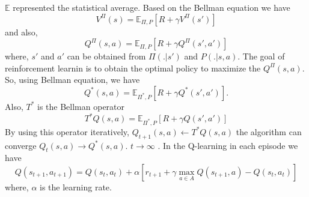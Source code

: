 \documentclass{article}
\begin{document}
  $\mathbb{E}$ represented the statistical average. 
 Based on the Bellman equation we have
 \begin{equation}
	V^{\Pi}(s) = \mathbb{E}_{\Pi,P}[R+\gamma V^{\Pi}(s')]
\end{equation}  
 and also, 
   \begin{equation}
  	Q^{\Pi}(s,a) = \mathbb{E}_{\Pi,P}[R+\gamma Q^{\Pi}(s',a')]
  \end{equation}  
  where, $s'$ and $a'$ can be obtained from $\Pi(.|s')$ and $P(.|s,a)$.
The goal of reinforcement learnin is to obtain the optimal policy to maximize the $Q^{\Pi}(s,a)$.
So, using Bellman equation, we have
\begin{equation}
	Q^{*}(s,a) = \mathbb{E}_{\Pi^*,P}[R+\gamma Q^{*}(s',a')].
\end{equation} 
Also, $T^*$ is the Bellman operator
\begin{equation}
	T^{*}Q(s,a) = \mathbb{E}_{\Pi^*,P}[R+\gamma Q(s',a')]
\end{equation} 
By using this operator iteratively, 
$Q_{t+1}(s,a) \leftarrow T^{*}Q(s,a) $
the algorithm can converge
$Q_{t}(s,a) \rightarrow Q^*(s,a)$.
 $t \rightarrow \infty $
\cite{montague1999reinforcement,gan1}.
In the Q-learning in each episode we have
\begin{equation}
	Q(s_{t+1},a_{t+1}) = Q(s_t,a_t)+\alpha[ r_{t+1} + \gamma \max_{a \in A}{Q(s_{t+1},a)}-Q(s_t,a_t)]
\end{equation}
where, $\alpha$ is the learning rate.
\end{document}
